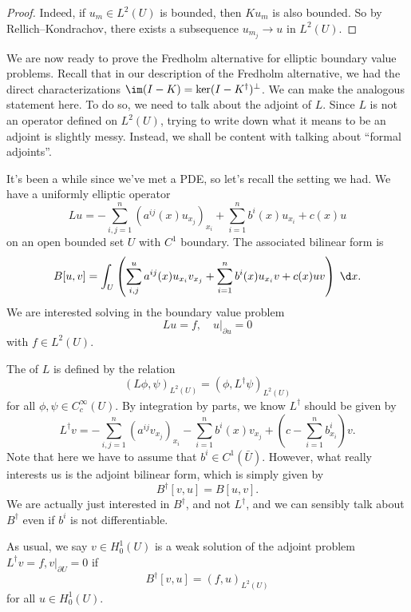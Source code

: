 \documentclass[a4paper]{article}
\begin{document}
\begin{proof}
  Indeed, if $u_m \in L^2(U)$ is bounded, then $K u_m$ is also bounded. So by Rellich--Kondrachov, there exists a subsequence $u_{m_j} \to u$ in $L^2(U)$.
\end{proof}

We are now ready to prove the Fredholm alternative for elliptic boundary value problems. Recall that in our description of the Fredholm alternative, we had the direct characterizations $\im (I - K) = \ker (I - K^\dagger)^\perp$. We can make the analogous statement here. To do so, we need to talk about the adjoint of $L$. Since $L$ is not an operator defined on $L^2(U)$, trying to write down what it means to be an adjoint is slightly messy. Instead, we shall be content with talking about ``formal adjoints''.

It's been a while since we've met a PDE, so let's recall the setting we had. We have a uniformly elliptic operator
\[
  Lu = - \sum_{i, j = 1}^n (a^{ij}(x) u_{x_j})_{x_i} + \sum_{i = 1}^n b^i(x) u_{x_i} + c(x) u
\]
on an open bounded set $U$ with $C^1$ boundary. The associated bilinear form is
\[
  B[u, v] = \int_U \left(\sum_{i, j}^u a^{ij}(x) u_{x_i} v_{x_j} + \sum_{i = 1}^n b^i(x) u_{x_i} v + c(x) uv\right)\;\d x.
\]
We are interested solving in the boundary value problem
\[
  Lu = f,\quad u|_{\partial u} = 0
\]
with $f \in L^2(U)$.

The  of $L$ is defined by the relation
\[
  (L\phi, \psi)_{L^2(U)} = (\phi, L^\dagger \psi)_{L^2(U)}
\]
for all $\phi, \psi \in C_c^\infty(U)$. By integration by parts, we know $L^\dagger$ should be given by
\[
  L^\dagger v = - \sum_{i, j = 1}^n (a^{ij} v_{x_j})_{x_i} - \sum_{i = 1}^n b^i(x) v_{x_j} + \left(c - \sum_{i = 1}^n b^i_{x_i}\right)v.
\]
Note that here we have to assume that $b^i \in C^1(\bar{U})$. However, what really interests us is the adjoint bilinear form, which is simply given by
\[
  B^\dagger[v, u] = B[u, v].
\]
We are actually just interested in $B^\dagger$, and not $L^\dagger$, and we can sensibly talk about $B^\dagger$ even if $b^i$ is not differentiable.

As usual, we say $v \in H_0^1(U)$ is a weak solution of the adjoint problem $L^\dagger v = f, v|_{\partial U} = 0$ if
\[
  B^\dagger[v, u] = (f, u)_{L^2(U)}
\]
for all $u \in H_0^1(U)$.
\end{document}
